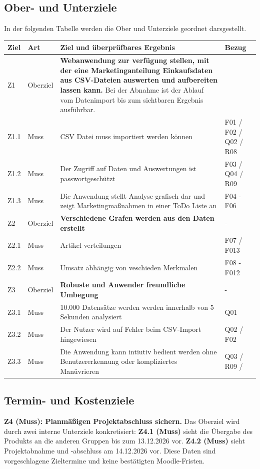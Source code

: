 \documentclass[a4paper,10pt]{article}
\begin{document}
\subsection*{Ober- und Unterziele}
In der folgenden Tabelle werden die Ober und Unterziele geordnet darsgestellt.
\begin{center}\begin{tabular}{P{.09\linewidth}P{.09\linewidth}P{.52\linewidth}P{.20\linewidth}}
\toprule\textbf{Ziel} & \textbf{Art} & \textbf{Ziel und überprüfbares Ergebnis} & \textbf{Bezug}\\\midrule
Z1 & Oberziel & \textbf{Webanwendung zur verfügung stellen, mit der eine Marketinganteilung Einkaufsdaten aus CSV-Dateien auswerten und aufbereiten lassen kann.} Bei der Abnahme ist der Ablauf vom Datenimport bis zum sichtbaren Ergebnis ausführbar. & \\\midrule
Z1.1 & Muss & CSV Datei muss importiert werden können & F01 / F02 / Q02 / R08 \\
Z1.2 & Muss & Der Zugriff auf Daten und Auswertungen ist passwortgeschützt & F03 / Q04 / R09 \\
Z1.3 & Muss & Die Anwendung stellt Analyse grafisch dar und zeigt Marketingmaßnahmen in einer ToDo Liste an & F04 - F06 \\
Z2 & Oberziel & \textbf{Verschiedene Grafen werden aus den Daten erstellt}  & - \\\midrule
Z2.1 & Muss & Artikel verteilungen & F07 / F013 \\
Z2.2 & Muss & Umsatz abhängig von veschieden Merkmalen & F08 - F012 \\
Z3 & Oberziel & \textbf{Robuste und Anwender freundliche Umbegung} & - \\\midrule
Z3.1 & Muss & 10.000 Datensätze werden werden innerhalb von 5 Sekunden analysiert  & Q01\\
Z3.2 & Muss & Der Nutzer wird auf Fehler beim CSV-Import hingewiesen & Q02 / F02 \\
Z3.3 & Muss & Die Anwendung kann intiutiv bedient werden ohne Benutzererkennung oder kompliziertes Manüvrieren & Q03 / R09 / \\\bottomrule\end{tabular}\end{center}


\subsection*{Termin- und Kostenziele}
\textbf{Z4 (Muss): Planmä\ss{}igen Projektabschluss sichern.} Das Oberziel wird durch zwei interne Unterziele konkretisiert: \textbf{Z4.1 (Muss)} sieht die Übergabe des Produkts an die anderen Gruppen bis zum 13.12.2026 vor. \textbf{Z4.2 (Muss)} sieht Projektabnahme und -abschluss am 14.12.2026 vor. Diese Daten sind vorgeschlagene Zieltermine und keine bestätigten Moodle-Fristen.
\end{document}

